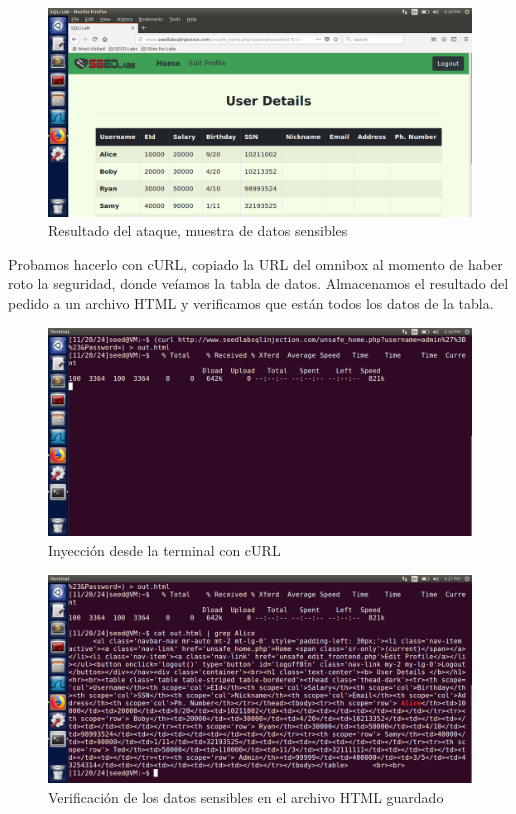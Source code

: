\documentclass[12pt]{article}
\begin{document}
\begin{figure}[h!]
    \centering
    \includegraphics[width=0.9\linewidth]{websuccess.png}
    \caption{Resultado del ataque, muestra de datos sensibles}
    \label{fig:enter-label}
\end{figure}

\newpage

Probamos hacerlo con cURL, copiado la URL del omnibox al momento de haber roto la seguridad, donde veíamos la tabla de datos. Almacenamos el resultado del pedido a un archivo HTML y verificamos que están todos los datos de la tabla.

\begin{figure}[h!]
    \centering
    \includegraphics[width=0.9\linewidth]{curl.png}
    \caption{Inyección desde la terminal con cURL}
    \label{fig:enter-label}
\end{figure}

\newpage

\begin{figure}[h!]
    \centering
    \includegraphics[width=0.9\linewidth]{curlalice.png}
    \caption{Verificación de los datos sensibles en el archivo HTML guardado}
    \label{fig:enter-label}
\end{figure}
\end{document}
